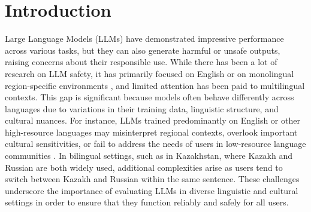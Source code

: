 \section{Introduction}
Large Language Models (LLMs) have demonstrated impressive performance across various tasks, but they can also generate harmful or unsafe outputs, raising concerns about their responsible use. While there has been a lot of research on LLM safety, it has primarily focused on English or on monolingual region-specific environments \citep{wang2023not, wang2024chinesedatasetevaluatingsafeguards, ashraf2024arabicdatasetllmsafeguard}, and limited attention has been paid to multilingual contexts. This gap is significant because models often behave differently across languages due to variations in their training data, linguistic structure, and cultural nuances. For instance, LLMs trained predominantly on English or other high-resource languages may misinterpret regional contexts, overlook important cultural sensitivities, or fail to address the needs of users in low-resource language communities \citep{song2024multilingualblendingllmsafety}. In bilingual settings, such as in Kazakhstan, where Kazakh and Russian are both widely used, additional complexities arise as users tend to switch between Kazakh and Russian within the same sentence.
These challenges underscore the importance of evaluating LLMs in diverse linguistic and cultural settings in order to ensure that they function reliably and safely for all users.


